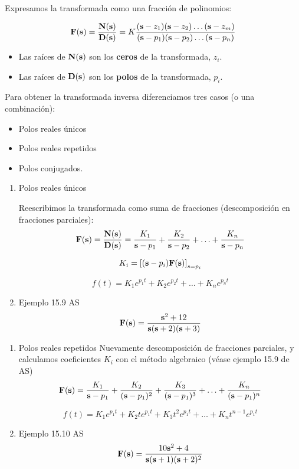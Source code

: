 Expresamos la transformada como una fracción de polinomios:

\[
  \mathbf{F}(\mathbf{s}) = \frac{\mathbf{N}(\mathbf{s})}{\mathbf{D}(\mathbf{s})} = K \frac{(\mathbf{s}-z_1) (\mathbf{s} - z_2) \ldots (\mathbf{s} - z_m)}{(\mathbf{s}-p_1) (\mathbf{s} - p_2) \ldots (\mathbf{s} - p_n)}
\]

\begin{itemize}
\item Las raíces de \(\mathbf{N}(\mathbf{s})\) son los \textbf{ceros} de la transformada, \(z_i\).
\item Las raíces de \(\mathbf{D}(\mathbf{s})\) son los \textbf{polos} de la transformada, \(p_i\).
\end{itemize}

\vspace{\baselineskip}

Para obtener la transformada inversa diferenciamos tres casos (o una combinación): 
\begin{itemize}
\item Polos reales únicos
\item Polos reales repetidos
\item Polos conjugados.
\end{itemize}


\begin{enumerate}
\item Polos reales únicos
\label{sec:orgc1fa786}

Reescribimos la transformada como suma de fracciones (descomposición en fracciones parciales):
\[
  \mathbf{F}(\mathbf{s}) = \frac{\mathbf{N}(\mathbf{s})}{\mathbf{D}(\mathbf{s})} = \frac{K_1}{\mathbf{s}-p_1} + \frac{K_2}{\mathbf{s}-p_2} + \ldots + \frac{K_n}{\mathbf{s}-p_n} 
\]

\[
  K_i = \left[(\mathbf{s} - p_i) \mathbf{F}(\mathbf{s})\right]_{s = p_i}
\]

\[
  f(t) = K_1 e^{p_1 t} + K_2 e^{p_2 t} + \ldots + K_n e^{p_n t}
\]

\item Ejemplo 15.9 AS
\label{sec:org75989c7}
\[
  \mathbf{F}(\mathbf{s}) = \frac{\mathbf{s}^2 + 12}{\mathbf{s}(\mathbf{s} + 2)(\mathbf{s} + 3)}
\]
\end{enumerate}


\begin{enumerate}
\item Polos reales repetidos
\label{sec:orge998b4f}
Nuevamente descomposición de fracciones parciales, y calculamos coeficientes \(K_i\) con el método algebraico (véase ejemplo 15.9 de AS)
\[
  \mathbf{F}(\mathbf{s}) = \frac{K_1}{\mathbf{s}-p_1} + \frac{K_2}{(\mathbf{s}-p_1)^2} + \frac{K_3}{(\mathbf{s}-p_1)^3} + \ldots + \frac{K_n}{(\mathbf{s}-p_1)^n} 
\]

\[
  f(t) = K_1 e^{p_1 t} + K_2 t e^{p_1 t} + K_3 t^2 e^{p_1 t} + \ldots + K_n t^{n-1} e^{p_1 t}
\]



\item Ejemplo 15.10 AS
\label{sec:org5dcd924}
\[
  \mathbf{F}(\mathbf{s}) = \frac{10\mathbf{s}^2 + 4}{\mathbf{s}(\mathbf{s} + 1)(\mathbf{s} + 2)^2}
\]
\end{enumerate}


